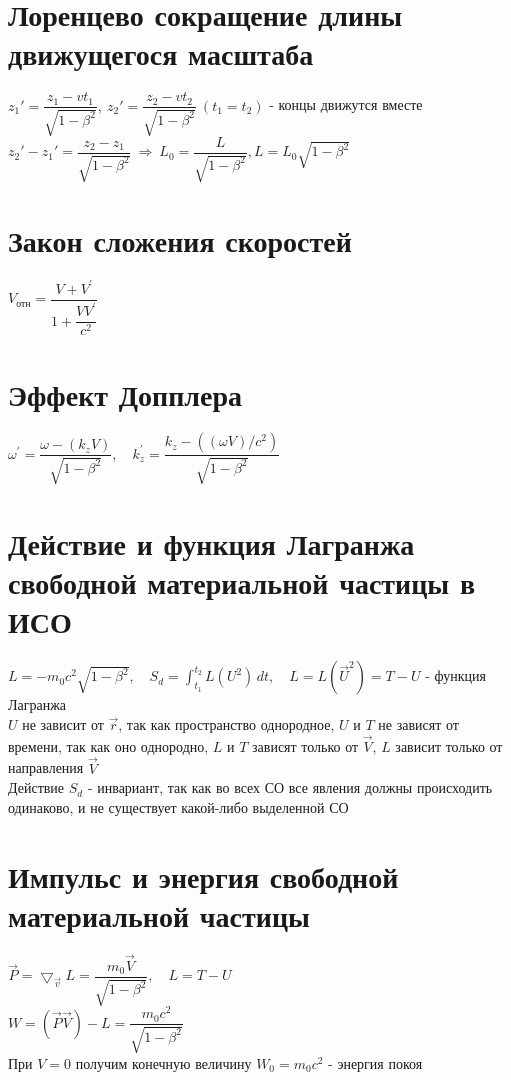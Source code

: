 \begin{multicols*}{2}
		\section{Лоренцево сокращение длины движущегося масштаба}
		
		$ z_1'= \dfrac{z_1-vt_1}{\sqrt{1-\beta^2}},~ z_2'= \dfrac{z_2-vt_2}{\sqrt{1-\beta^2}} ~ (t_1=t_2)$ - концы движутся вместе \\
		$ z_2'-z_1' = \dfrac{z_2-z_1}{\sqrt{1-\beta^2}} ~ \Rightarrow ~ L_0 = \dfrac{L}{\sqrt{1-\beta^2}}, L = L_0\sqrt{1-\beta^2} $
		
		\section{Закон сложения скоростей}
		$V_\text{отн} = \dfrac{V+V^\prime}{1+\dfrac{VV^\prime}{c^2}}$
		
		\section{Эффект Допплера}
		$\omega^\prime = \dfrac{\omega - (k_z V)}{\sqrt{1-\beta^2}}, \quad k_z^\prime = \dfrac{k_z - ((\omega V)/c^2)}{\sqrt{1-\beta^2}}$

		\section{Действие и функция Лагранжа свободной материальной частицы в ИСО}
		$L = -m_0c^2 \sqrt{1-\beta^2}, \quad S_d = \int_{t_1}^{t_2} L(U^2) \,dt, \quad L = L(\vec{U}^2) = T-U $ - функция Лагранжа\\
		$U$ не зависит от $\vec{r}$, так как пространство однородное, $U$ и $T$ не зависят от времени, так как оно однородно, $L$ и $T$ зависят только от $\vec{V}$, $L$ зависит только от направления $\vec{V}$\\
		Действие $S_d$ - инвариант, так как во всех СО все явления должны происходить одинаково, и не существует какой-либо выделенной СО
		
		\section{Импульс и энергия свободной материальной частицы}
		$\vec{P} = \bigtriangledown_{\vec{v}}L = \dfrac{m_0\vec{V}}{\sqrt{1-\beta^2}}, \quad L = T-U$\\
		$W = (\vec{P}\vec{V})-L = \dfrac{m_0c^2}{\sqrt{1-\beta^2}}$\\
		При $V = 0$ получим конечную величину $W_0 = m_0c^2$ - энергия покоя
		

\end{multicols*}
